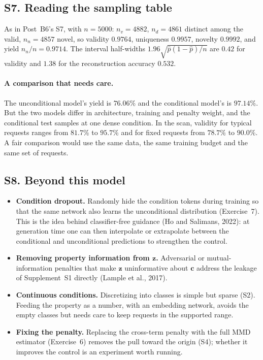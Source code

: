 \documentclass[11pt]{article}
\begin{document}
\label{sec:S7}
\subsection*{S7. Reading the sampling table}
As in Post~B6's S7, with $n=5000$: $n_v=4882$, $n_d=4861$ distinct among the valid, $n_n=4857$ novel, so validity $0.9764$, uniqueness $0.9957$, novelty $0.9992$, and yield $n_n/n=0.9714$. The interval half-widths $1.96\sqrt{\hat p(1-\hat p)/n}$ are $0.42$ for validity and $1.38$ for the reconstruction accuracy $0.532$.

\paragraph{A comparison that needs care.} The unconditional model's yield is $76.06\%$ and the conditional model's is $97.14\%$. But the two models differ in architecture, training and penalty weight, and the conditional test samples at one dense condition. In the scan, validity for typical requests ranges from $81.7\%$ to $95.7\%$ and for fixed requests from $78.7\%$ to $90.0\%$. A fair comparison would use the same data, the same training budget and the same set of requests.

\label{sec:S8}
\subsection*{S8. Beyond this model}
\begin{itemize}[nosep]
  \item \textbf{Condition dropout.} Randomly hide the condition tokens during training so that the same network also learns the unconditional distribution (Exercise~7). This is the idea behind classifier-free guidance (Ho and Salimans, 2022): at generation time one can then interpolate or extrapolate between the conditional and unconditional predictions to strengthen the control.
  \item \textbf{Removing property information from $\bm z$.} Adversarial or mutual-information penalties that make $\bm z$ uninformative about $\bm c$ address the leakage of Supplement~S1 directly (Lample et al., 2017).
  \item \textbf{Continuous conditions.} Discretizing into classes is simple but sparse (S2). Feeding the property as a number, with an embedding network, avoids the empty classes but needs care to keep requests in the supported range.
  \item \textbf{Fixing the penalty.} Replacing the cross-term penalty with the full MMD estimator (Exercise~6) removes the pull toward the origin (S4); whether it improves the control is an experiment worth running.
\end{itemize}
\end{document}
